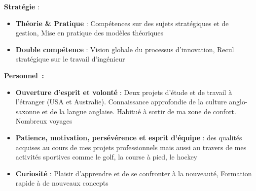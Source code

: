 \documentclass[]{friggeri-cv} %
\begin{document}
\textbf{\large Stratégie} :
\vspace{-0.1cm}
\begin{itemize}[noitemsep,nolistsep]
\item \textbf{Théorie \& Pratique} : Compétences sur des sujets stratégiques et de gestion, Mise en pratique des modèles théoriques
\item \textbf{Double compétence} : Vision globale du processus d'innovation, Recul stratégique sur le travail d'ingénieur
\end{itemize}

\textbf{\large Personnel~:} 
\vspace{-0.1cm}
\begin{itemize}[noitemsep,nolistsep]
\item \textbf{Ouverture d'esprit et volonté} : Deux projets d'étude et de travail à l'étranger (USA et Australie). Connaissance approfondie de la culture anglo-saxonne et de la langue anglaise. Habitué à sortir de ma zone de confort. Nombreux voyages
\item \textbf{Patience, motivation, persévérence et esprit d'équipe} : des qualités acquises au cours de mes projets professionnels mais aussi au travers de mes activités sportives comme le golf, la course à pied, le hockey
\item \textbf{Curiosité} : Plaisir d'apprendre et de se confronter à la nouveauté, Formation rapide à de nouveaux concepts
\end{itemize}






\end{document}
